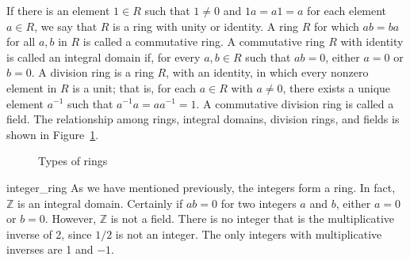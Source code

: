  
If there is an element $1 \in R$ such that $1 \neq 0$ and  $1a = a1 =
a$ for each element $a \in R$, we say that $R$ is a ring with {\bfi
unity\/} or {\bfi identity\/}. A ring $R$ for which $ab = ba$ for all $a, 
b$ in $R$ is called a {\bfi commutative
ring}. A commutative
ring $R$ with identity is called an {\bfi integral
domain\/} if, for every $a, b  \in R$ such that
$ab = 0$, either $a = 0$ or $b = 0$.  A {\bfi division
ring\/} is a ring $R$, with an
identity, in which every nonzero element in $R$ is a {\bfi
unit}; that is, for each $a \in R$ with $a \neq 0$, there
exists a unique element $a^{-1}$ such that $a^{-1} a = a a^{-1}  = 1$.
A commutative division ring is called a {\bfi field}. 
The relationship among rings, integral domains, division rings, and
fields is shown in Figure~\ref{Rings}.  
 
\begin{figure}[hbt] %
\begin{center}

\end{center}
\caption{Types of rings}
\label{Rings}
\end{figure}
 
 
 
\begin{example}{integer_ring}
As we have mentioned previously, the integers form a ring. In fact, ${\mathbb
Z}$ is an integral domain.  Certainly if $a b = 0$ for two integers
$a$ and $b$, either $a=0$ or $b=0$. However, ${\mathbb Z}$ is not a
field. There is no integer that is the multiplicative inverse of 2,
since $1/2$ is not an integer.  The only integers with multiplicative
inverses are 1 and $-1$.  
\end{example}
 

